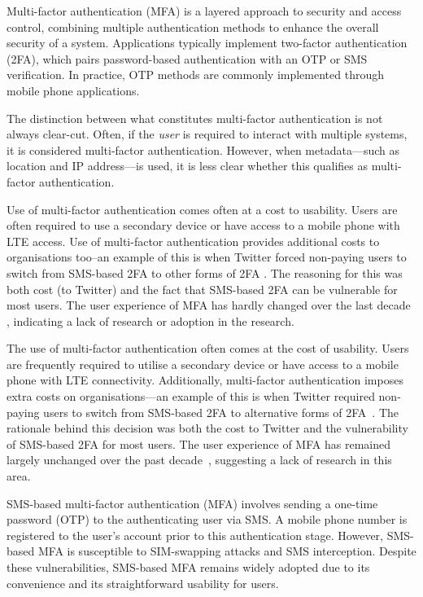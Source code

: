 Multi-factor authentication (MFA) is a layered approach to security and access control, combining multiple authentication methods to enhance the overall security of a system. Applications typically implement two-factor authentication (2FA), which pairs password-based authentication with an OTP or SMS verification. In practice, OTP methods are commonly implemented through mobile phone applications.

The distinction between what constitutes multi-factor authentication is not always clear-cut. Often, if the \textit{user} is required to interact with multiple systems, it is considered multi-factor authentication. However, when metadata---such as location and IP address---is used, it is less clear whether this qualifies as multi-factor authentication.

Use of multi-factor authentication comes often at a cost to usability. Users are often required to use a secondary device or have access to a mobile phone with LTE access. Use of multi-factor authentication provides additional costs to organisations too--an example of this is when Twitter forced non-paying users to switch from SMS-based 2FA to other forms of 2FA \cite{taylor_twitter_2023}. The reasoning for this was both cost (to Twitter) and the fact that SMS-based 2FA can be vulnerable for most users. The user experience of MFA has hardly changed over the last decade \cite{cristofaro_comparative_2014}, indicating a lack of research or adoption in the research.

The use of multi-factor authentication often comes at the cost of usability. Users are frequently required to utilise a secondary device or have access to a mobile phone with LTE connectivity. Additionally, multi-factor authentication imposes extra costs on organisations---an example of this is when Twitter required non-paying users to switch from SMS-based 2FA to alternative forms of 2FA~\cite{taylor_twitter_2023}. The rationale behind this decision was both the cost to Twitter and the vulnerability of SMS-based 2FA for most users. The user experience of MFA has remained largely unchanged over the past decade~\cite{cristofaro_comparative_2014}, suggesting a lack of research in this area.

SMS-based multi-factor authentication (MFA) involves sending a one-time password (OTP) to the authenticating user via SMS. A mobile phone number is registered to the user's account prior to this authentication stage. However, SMS-based MFA is susceptible to SIM-swapping attacks and SMS interception. Despite these vulnerabilities, SMS-based MFA remains widely adopted due to its convenience and its straightforward usability for users.

